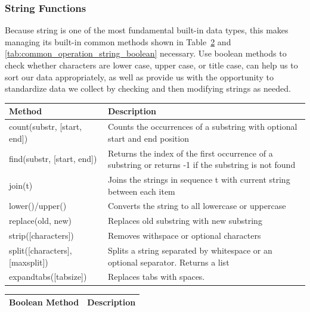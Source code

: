 \documentclass[../main.tex]{subfiles}
\begin{document}
\subsubsection{String Functions}
 Because string is one of the most fundamental built-in data types, this makes managing its built-in common methods shown in Table~\ref{tab:common_operation_string} and \ref{tab:common_operation_string_boolean} necessary.  Use boolean methods to check whether characters are lower case, upper case, or title case, can help us to sort our data appropriately, as well as provide us with the opportunity to standardize data we collect by checking and then modifying strings as needed. 
\begin{table}[!ht]
\begin{small}
\centering
\noindent{}
 \noindent \begin{tabular}{|p{}|p{}| }
  \hline
Method & Description   \\ \hline
count(substr, [start, end])  & Counts the occurrences of a substring with optional start and end position \\\hline
find(substr, [start, end])  &Returns the index of the first occurrence of a substring or returns -1 if the substring is not found\\ \hline
join(t)  &Joins the strings in sequence t with current string between each item\\ \hline
lower()/upper() &Converts the string to all lowercase or uppercase\\ \hline
replace(old, new) &Replaces old substring with new substring\\ \hline
strip([characters]) &Removes withspace or optional characters\\ \hline
split([characters], [maxsplit]) &Splits a string separated by whitespace or an optional separator. Returns a list\\ \hline
expandtabs([tabsize]) & Replaces tabs with spaces.
\end{tabular}
  \label{tab:common_operation_string}
  
  \centering
\noindent{}
 \noindent \begin{tabular}{|p{}|p{}| }
  \hline
Boolean Method & Description   \\ \hline


\end{tabular}
\end{small}
\end{table}
\end{document}
